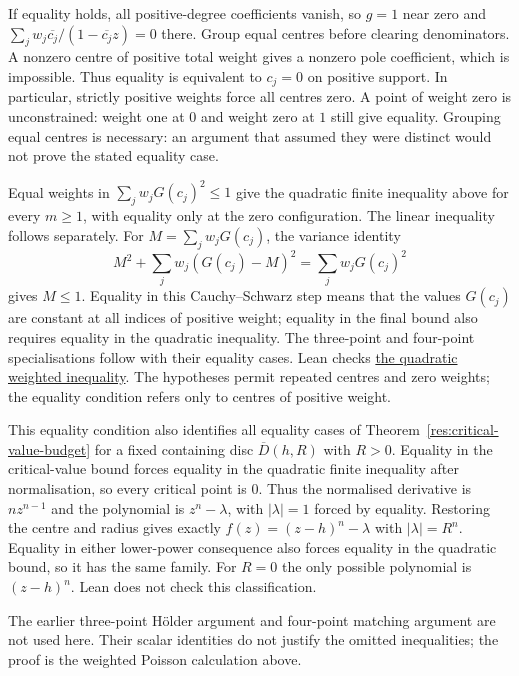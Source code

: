 If equality holds, all positive-degree coefficients vanish, so $g=1$ near
zero and $\sum_jw_j\overline{c_j}/(1-\overline{c_j}z)=0$ there.
Group equal centres before clearing denominators. A nonzero centre of positive
total weight gives a nonzero pole coefficient, which is impossible. Thus
equality is equivalent to $c_j=0$ on positive support. In particular,
strictly positive weights force all centres zero. A point of weight zero
is unconstrained: weight one at $0$ and weight zero at $1$ still give
equality.
Grouping equal centres is necessary: an argument that assumed they
were distinct would not prove the stated equality case.

Equal weights in $\sum_jw_jG(c_j)^2\le1$ give the quadratic finite
inequality above for every $m\ge1$, with equality only at the zero
configuration. The linear inequality follows separately. For
$M=\sum_jw_jG(c_j)$, the variance identity
\[
 M^2+\sum_jw_j(G(c_j)-M)^2=\sum_jw_jG(c_j)^2
\]
gives $M\le1$. Equality in this Cauchy--Schwarz step means that the
values $G(c_j)$ are constant at all indices of positive weight; equality
in the final bound also requires equality in the quadratic inequality. The
three-point and four-point specialisations follow with their equality
cases.  Lean checks
\href{https://github.com/wcook04/plectis-erdos/blob/3d6d938d696fed0fb71dd55115a18a73738ff223/lean/ErdosProblems/Erdos1041/PaperWeightedRefinementsR10.lean\#L17}{the quadratic weighted inequality}.
The hypotheses permit repeated centres and zero weights;
the equality condition refers only to centres of positive weight.

This equality condition also identifies all equality cases of
Theorem~\ref{res:critical-value-budget} for a fixed containing disc
$\overline D(h,R)$ with $R>0$. Equality in the critical-value bound
forces equality in the quadratic finite inequality after normalisation,
so every critical point is $0$. Thus the normalised derivative is
$nz^{n-1}$ and the polynomial is $z^n-\lambda$, with $|\lambda|=1$
forced by equality. Restoring the centre and radius gives exactly
$f(z)=(z-h)^n-\lambda$ with $|\lambda|=R^n$.
Equality in either lower-power consequence also forces equality in the
quadratic bound, so it has the same family. For $R=0$ the only possible
polynomial is $(z-h)^n$. Lean does not check this classification.

The earlier three-point H\"older argument and four-point matching argument
are not used here. Their scalar identities do not justify the omitted
inequalities; the proof is the weighted Poisson calculation above.


